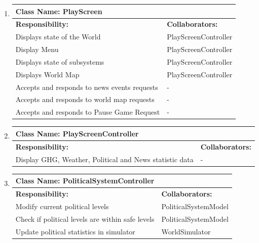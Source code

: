 \documentclass[]{article}
\begin{document}
\begin{enumerate}[1.]
\begin{tabular}{|p{10cm}|p{4cm}|}
	    \hline
	  \end{tabular}

	\item
	\begin{tabular}{|p{10cm}|p{4cm}|}
	    \hline
	     \multicolumn{2}{|l|}{\textbf{Class Name:  PlayScreen}} \\
	    \hline
	    \textbf{Responsibility:} & \textbf{Collaborators:} \\
	    \hline
	    Displays state of the World & PlayScreenController \\
	Display Menu & PlayScreenController \\
	Displays state of subsystems & PlayScreenController \\
	Displays World Map & PlayScreenController \\
	Accepts and responds to news events requests & - \\
	Accepts and responds to world map requests & - \\
	Accepts and responds to Pause Game Request & - \\

	    \hline
	  \end{tabular}

	\item
	\begin{tabular}{|p{10cm}|p{4cm}|}
	    \hline
	     \multicolumn{2}{|l|}{\textbf{Class Name:  PlayScreenController}} \\
	    \hline
	    \textbf{Responsibility:} & \textbf{Collaborators:} \\
	    \hline
	    Display GHG, Weather, Political and News statistic data & - \\

	    \hline
	  \end{tabular}

	\item
	\begin{tabular}{|p{10cm}|p{4cm}|}
	    \hline
	     \multicolumn{2}{|l|}{\textbf{Class Name:  PoliticalSystemController}} \\
	    \hline
	    \textbf{Responsibility:} & \textbf{Collaborators:} \\
	    \hline
	    Modify current political levels & PoliticalSystemModel \\
	Check if political levels are within safe levels & PoliticalSystemModel \\
	Update political statistics in simulator & WorldSimulator \\


\end{tabular}
\end{enumerate}
\end{document}

